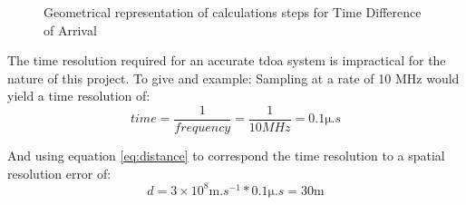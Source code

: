 \documentclass[class=report,11pt,crop=false]{standalone}
\begin{document}
\begin{figure}[h]\centering
    \hfill
    \hfill 
    \caption{Geometrical representation of calculations steps for Time Difference of Arrival \cite{tdoa-calculation}}
    \label{tdao geometry}
\end{figure}


The time resolution required for an accurate \gls{tdoa} system is impractical for the nature of this project. To give and example: Sampling at a rate of 10 MHz would yield a time resolution of:
\begin{equation*}
    time = \frac{1}{frequency} = \frac{1}{10 \si{MHz}} = 0.1 \si{\micro . s}
\end{equation*}

And using equation \ref{eq:distance} to correspond the time resolution to a spatial resolution error of:
\begin{equation*}
    d = 3 \times 10^8 \si{\meter . s^{-1}} * 0.1 \si{\micro . s} = 30 \si{\meter} 
\end{equation*}
\end{document}

